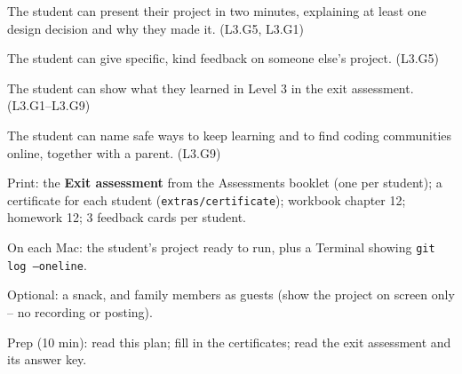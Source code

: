 
\begin{objectives}
  \item The student can present their project in two minutes, explaining at least one design decision and why they made it. (L3.G5, L3.G1)
  \item The student can give specific, kind feedback on someone else's project. (L3.G5)
  \item The student can show what they learned in Level 3 in the exit assessment. (L3.G1--L3.G9)
  \item The student can name safe ways to keep learning and to find coding communities online, together with a parent. (L3.G9)
\end{objectives}

\begin{materials}
  \item Print: the \textbf{Exit assessment} from the Assessments booklet (one per student); a certificate for each student (\texttt{extras/certificate}); workbook chapter 12; homework 12; 3 feedback cards per student.
  \item On each Mac: the student's project ready to run, plus a Terminal showing \texttt{git log --oneline}.
  \item Optional: a snack, and family members as guests (show the project on screen only -- no recording or posting).
  \item Prep (10 min): read this plan; fill in the certificates; read the exit assessment and its answer key.
\end{materials}

\begin{timeplan}
\end{timeplan}

